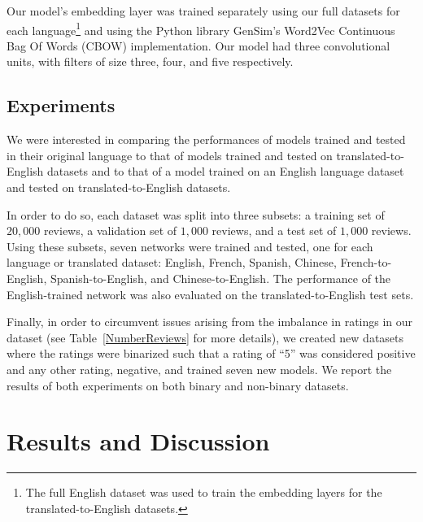 \documentclass[11pt,a4paper]{article}
\begin{document}
    Our model's embedding layer was trained separately using our full datasets for each language\footnote{The full English dataset was used to train the embedding layers for the translated-to-English datasets.\label{embedding_note}} and using the Python library GenSim's \cite{gensim} Word2Vec Continuous Bag Of Words (CBOW) implementation. Our model had three convolutional units, with filters of size three, four, and five respectively.

\subsection{Experiments}
    We were interested in comparing the performances of models trained and tested in their original language to that of models trained and tested on translated-to-English datasets and to that of a model trained on an English language dataset and tested on translated-to-English datasets.
   
    In order to do so, each dataset was split into three subsets: a training set of $20,000$ reviews, a validation set of $1,000$ reviews, and a test set of $1,000$ reviews. Using these subsets, seven networks were trained and tested, one for each language or translated dataset: English, French, Spanish, Chinese, French-to-English, Spanish-to-English, and Chinese-to-English. The performance of the English-trained network was also evaluated on the translated-to-English test sets.
    
   Finally, in order to circumvent issues arising from the imbalance in ratings in our dataset (see Table~\ref{NumberReviews} for more details), we created new datasets where the ratings were binarized such that a rating of ``5'' was considered positive and any other rating, negative, and trained seven new models. We report the results of both experiments on both binary and non-binary datasets.  
   
   
\section{Results and Discussion}
    
\end{document}
